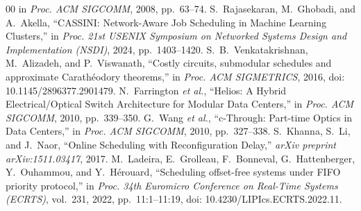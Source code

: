 \documentclass[conference]{IEEEtran}
\begin{document}
\begin{thebibliography}{00}
in \emph{Proc. ACM SIGCOMM}, 2008, pp.~63--74.
S.~Rajasekaran, M.~Ghobadi, and A.~Akella,
``CASSINI: Network-Aware Job Scheduling in Machine Learning Clusters,''
in \emph{Proc. 21st USENIX Symposium on Networked Systems Design and
Implementation (NSDI)}, 2024, pp.~1403--1420.
S.~B.~Venkatakrishnan, M.~Alizadeh, and P.~Viswanath,
``Costly circuits, submodular schedules and approximate Carath\'eodory theorems,''
in \emph{Proc. ACM SIGMETRICS}, 2016,
doi: 10.1145/2896377.2901479.
N.~Farrington \emph{et al.},
``Helios: A Hybrid Electrical/Optical Switch Architecture for Modular Data Centers,''
in \emph{Proc. ACM SIGCOMM}, 2010, pp.~339--350.
G.~Wang \emph{et al.},
``c-Through: Part-time Optics in Data Centers,''
in \emph{Proc. ACM SIGCOMM}, 2010, pp.~327--338.
S.~Khanna, S.~Li, and J.~Naor,
``Online Scheduling with Reconfiguration Delay,''
\emph{arXiv preprint arXiv:1511.03417}, 2017.
M.~Ladeira, E.~Grolleau, F.~Bonneval, G.~Hattenberger, Y.~Ouhammou,
and Y.~H\'erouard,
``Scheduling offset-free systems under FIFO priority protocol,''
in \emph{Proc. 34th Euromicro Conference on Real-Time Systems (ECRTS)},
vol.~231, 2022, pp.~11:1--11:19,
doi: 10.4230/LIPIcs.ECRTS.2022.11.
\end{thebibliography}
\end{document}
